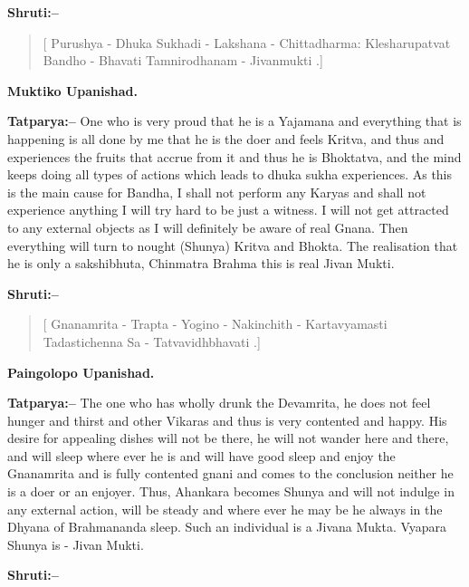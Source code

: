 \textbf{Shruti:–}

\begin{verse}
[ Purushya - Dhuka Sukhadi - Lakshana - Chitta\break dharma:  Klesharupatvat Bandho - Bhavati  Tam\break nirodhanam - Jivanmukti .]
\end{verse}

\begin{flushright}
\textbf{Muktiko Upanishad.}
\end{flushright}

\textbf{Tatparya:–} One who is very proud that he is a Yajamana and everything that is happening is all done by me that he is the doer and feels Kritva, and thus and experiences the fruits that accrue from it and thus he is Bhoktatva, and the mind keeps doing all types of actions which leads to dhuka sukha experiences. As this is the main cause for Bandha, I shall not perform any Karyas and shall not experience anything I will try hard to be just a witness. I will not get attracted to any external objects as I will definitely be aware of real Gnana. Then everything will turn to nought (Shunya) Kritva and Bhokta. The realisation that he is only a sakshibhuta, Chinmatra Brahma this is real Jivan Mukti.

\newpage

\textbf{Shruti:–}

\begin{verse}
[ Gnanamrita - Trapta - Yogino - Nakinchith - Kartavyamasti  Tadastichenna Sa - Tatvavidhbhavati .]
\end{verse}

\begin{flushright}
\textbf{Paingolopo Upanishad.}
\end{flushright}

\textbf{Tatparya:–} The one who has wholly drunk the Devamrita, he does not feel hunger and thirst and other Vikaras and thus is very contented and happy. His desire for appealing dishes will not be there, he will not wander here and there, and will sleep where ever he is and will have good sleep and enjoy the Gnanamrita and is fully contented gnani and comes to the conclusion neither he is a doer or an enjoyer. Thus, Ahankara becomes Shunya and will not indulge in any external action, will be steady and where ever he may be he always in the Dhyana of Brahmananda sleep. Such an individual is a Jivana Mukta. Vyapara Shunya is - Jivan Mukti.

\textbf{Shruti:–}

